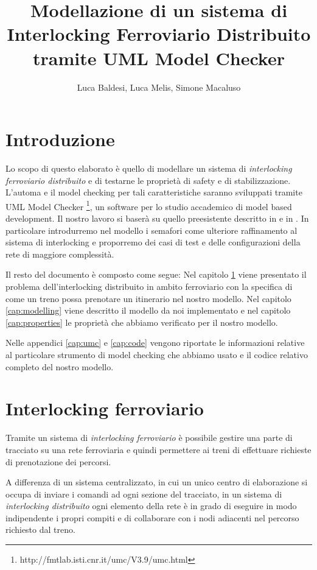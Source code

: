 \documentclass[10pt,a4paper,oneside]{report}
\author{Luca Baldesi, Luca Melis, Simone Macaluso}
\title{Modellazione di un sistema di
Interlocking Ferroviario Distribuito
tramite UML Model Checker
}
\begin{document}
\maketitle
\tableofcontents
\chapter*{Introduzione}
Lo scopo di questo elaborato è quello di modellare un sistema di
\emph{interlocking ferroviario distribuito} e di testarne le proprietà di safety e di stabilizzazione. L'automa e il model checking per tali caratteristiche saranno sviluppati tramite UML Model Checker \footnote{http://fmtlab.isti.cnr.it/umc/V3.9/umc.html}, un software per lo studio accademico di model based development. Il nostro lavoro si baserà su quello preesistente descritto in \cite{Paolieri} e in \cite{RossettoRocciolo}. In particolare introdurremo nel modello i semafori come ulteriore raffinamento al sistema di interlocking e proporremo dei casi di test e delle configurazioni della rete di maggiore complessità.

Il resto del documento è composto come segue:
Nel capitolo \ref{cap:interlocking} viene presentato il problema dell'interlocking distribuito in ambito ferroviario con la specifica di come un treno possa prenotare un itinerario nel nostro modello. Nel capitolo \ref{cap:modelling} viene descritto il modello da noi implementato e nel capitolo \ref{cap:properties} le proprietà che abbiamo verificato per il nostro modello.

Nelle appendici \ref{cap:umc} e \ref{cap:code} vengono riportate le informazioni relative al particolare strumento di model checking che abbiamo usato e il codice relativo completo del nostro modello.
\chapter{Interlocking ferroviario}
\label{cap:interlocking}
Tramite un sistema di \textit{interlocking ferroviario} è possibile gestire una parte di tracciato su una rete ferroviaria e quindi permettere ai treni di effettuare richieste di prenotazione dei percorsi.

A differenza di un sistema centralizzato, in cui un unico centro di elaborazione si occupa di inviare i comandi ad ogni sezione del tracciato, in un sistema di \textit{interlocking distribuito} ogni elemento della rete è in grado di eseguire in modo indipendente i propri compiti e di collaborare con i nodi adiacenti nel percorso richiesto dal treno.
\end{document}
